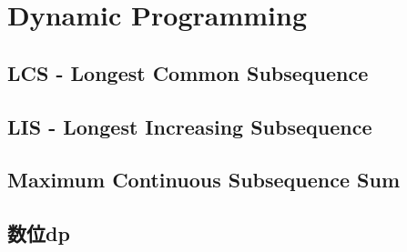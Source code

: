 \section{Dynamic Programming}
	\subsection{LCS - Longest Common Subsequence}
		
	\subsection{LIS - Longest Increasing Subsequence}
		
	\subsection{Maximum Continuous Subsequence Sum}
		
	\subsection{数位dp}
		
